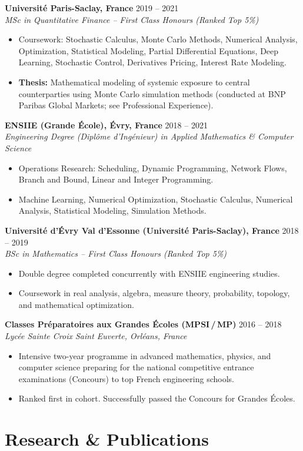 \documentclass[10pt, a4paper]{article}
\newcommand{\entry}[4]{
    \vspace{0.15em}
    \noindent \textbf{#1} \hfill #2 \\
    {\small \textit{#3}}
    \begin{itemize}[leftmargin=1.2em, nosep, label=\tiny$\bullet$, itemsep=1pt]
        #4
    \end{itemize}
}
\begin{document}
\entry{Universit\'e Paris-Saclay, France}{2019 -- 2021}
{MSc in Quantitative Finance -- First Class Honours (Ranked Top 5\%)}
{
    \item Coursework: Stochastic Calculus, Monte Carlo Methods, Numerical Analysis, Optimization, Statistical Modeling, Partial Differential Equations, Deep Learning, Stochastic Control, Derivatives Pricing, Interest Rate Modeling.
    \item \textbf{Thesis:} Mathematical modeling of systemic exposure to central counterparties using Monte Carlo simulation methods (conducted at BNP Paribas Global Markets; see Professional Experience).
}

\entry{ENSIIE (Grande \'Ecole), \'Evry, France}{2018 -- 2021}
{Engineering Degree (Dipl\^ome d'Ing\'enieur) in Applied Mathematics \& Computer Science}
{
    \item Operations Research: Scheduling, Dynamic Programming, Network Flows, Branch and Bound, Linear and Integer Programming.
    \item Machine Learning, Numerical Optimization, Stochastic Calculus, Numerical Analysis, Statistical Modeling, Simulation Methods.
}

\entry{Universit\'e d'\'Evry Val d'Essonne (Universit\'e Paris-Saclay), France}{2018 -- 2019}
{BSc in Mathematics -- First Class Honours (Ranked Top 5\%)}
{
    \item Double degree completed concurrently with ENSIIE engineering studies.
    \item Coursework in real analysis, algebra, measure theory, probability, topology, and mathematical optimization.
}

\entry{Classes Pr\'eparatoires aux Grandes \'Ecoles (MPSI\,/\,MP)}{2016 -- 2018}
{Lyc\'ee Sainte Croix Saint Euverte, Orl\'eans, France}
{
    \item Intensive two-year programme in advanced mathematics, physics, and computer science preparing for the national competitive entrance examinations (Concours) to top French engineering schools.
    \item Ranked first in cohort. Successfully passed the Concours for Grandes \'Ecoles.
}

\section{Research \& Publications}
\end{document}
